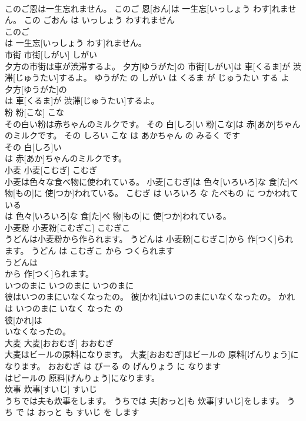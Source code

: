 \documentclass[8pt]{extreport}
\begin{document}
\begin{CJK}{UTF8}{min}
\\	このご恩は一生忘れません。	このご 恩[おん]は 一生忘[いっしょう わす]れません。	この ごおん は いっしょう わすれません	
\\	このご
\\	は 一生忘[いっしょう わす]れません。			
\\	市街	市街[しがい]	しがい	
\\	夕方の市街は車が渋滞するよ。	夕方[ゆうがた]の 市街[しがい]は 車[くるま]が 渋滞[じゅうたい]するよ。	ゆうがた の しがい は くるま が じゅうたい する よ	
\\	夕方[ゆうがた]の
\\	は 車[くるま]が 渋滞[じゅうたい]するよ。			
\\	粉	粉[こな]	こな	
\\	その白い粉は赤ちゃんのミルクです。	その 白[しろ]い 粉[こな]は 赤[あか]ちゃんのミルクです。	その しろい こな は あかちゃん の みるく です	
\\	その 白[しろ]い
\\	は 赤[あか]ちゃんのミルクです。			
\\	小麦	小麦[こむぎ]	こむぎ	
\\	小麦は色々な食べ物に使われている。	小麦[こむぎ]は 色々[いろいろ]な 食[た]べ 物[もの]に 使[つか]われている。	こむぎ は いろいろ な たべもの に つかわれて いる	
\\	は 色々[いろいろ]な 食[た]べ 物[もの]に 使[つか]われている。			
\\	小麦粉	小麦粉[こむぎこ]	こむぎこ	
\\	うどんは小麦粉から作られます。	うどんは 小麦粉[こむぎこ]から 作[つく]られます。	うどん は こむぎこ から つくられます	
\\	うどんは
\\	から 作[つく]られます。			
\\	いつのまに	いつのまに	いつのまに	
\\	彼はいつのまにいなくなったの。	彼[かれ]はいつのまにいなくなったの。	かれ は いつのまに いなく なった の	
\\	彼[かれ]は
\\	いなくなったの。			
\\	大麦	大麦[おおむぎ]	おおむぎ	
\\	大麦はビールの原料になります。	大麦[おおむぎ]はビールの 原料[げんりょう]になります。	おおむぎ は びーる の げんりょう に なります	
\\	はビールの 原料[げんりょう]になります。			
\\	炊事	炊事[すいじ]	すいじ	
\\	うちでは夫も炊事をします。	うちでは 夫[おっと]も 炊事[すいじ]をします。	うち で は おっと も すいじ を します	

\end{CJK}
\end{document}
